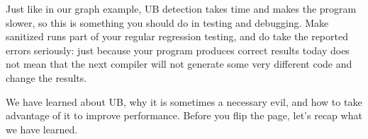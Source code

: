 Just like in our graph example, UB detection takes time and makes the program slower, so this is something you should do in testing and debugging. Make sanitized runs part of your regular regression testing, and do take the reported errors seriously: just because your program produces correct results today does not mean that the next compiler will not generate some very different code and change the results.

We have learned about UB, why it is sometimes a necessary evil, and how to take advantage of it to improve performance. Before you flip the page, let's recap what we have learned.

























